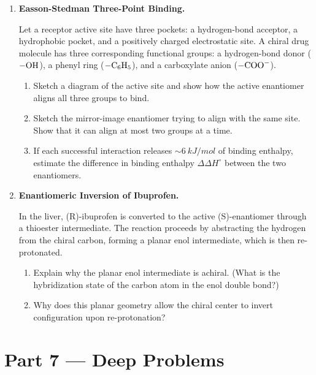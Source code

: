 \documentclass[12pt, a4paper]{book}
\begin{document}
\begin{problembox}
\begin{enumerate}[label=\textbf{P\arabic*.}]
  \item \textbf{Easson-Stedman Three-Point Binding.}
  
        Let a receptor active site have three pockets: a hydrogen-bond acceptor, a hydrophobic pocket, and a positively charged electrostatic site.
        A chiral drug molecule has three corresponding functional groups: a hydrogen-bond donor ($-\ce{OH}$), a phenyl ring ($-\ce{C6H5}$), and a carboxylate anion ($-\ce{COO-}$).
        \begin{enumerate}[label=(\alph*)]
          \item Sketch a diagram of the active site and show how the active enantiomer aligns all three groups to bind.
          \item Sketch the mirror-image enantiomer trying to align with the same site. Show that it can align at most two groups at a time.
          \item If each successful interaction releases $\sim \SI{6}{kJ/mol}$ of binding enthalpy, estimate the difference in binding enthalpy $\Delta \Delta H^\circ$ between the two enantiomers.
        \end{enumerate}

  \item \textbf{Enantiomeric Inversion of Ibuprofen.}
  
        In the liver, (R)-ibuprofen is converted to the active (S)-enantiomer through a thioester intermediate. The reaction proceeds by abstracting the hydrogen from the chiral carbon, forming a planar enol intermediate, which is then re-protonated.
        \begin{enumerate}[label=(\alph*)]
          \item Explain why the planar enol intermediate is achiral. (What is the hybridization state of the carbon atom in the enol double bond?)
          \item Why does this planar geometry allow the chiral center to invert configuration upon re-protonation?
        \end{enumerate}
\end{enumerate}
\end{problembox}

\newpage

\section{Part 7 --- Deep Problems}
\end{document}
